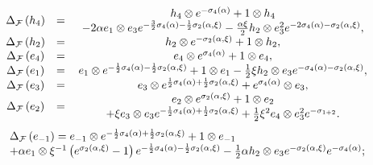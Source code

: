\documentclass[a4paper,12pt,showkeys]{article}
\begin{document}
\begin{eqnarray*}
\begin{array}{ccc}
\Delta _{{\cal F}}\left( h_{4}\right)  & = &
\begin{array}{c}
h_{4}\otimes e^{-{\bf  \sigma }_{4} (\alpha) }+1\otimes h_{4}
\\
- 2 \alpha   e_1 \otimes  e_3 e^{-\frac{3}{2}{\bf  \sigma }_{4}
(\alpha) -\frac{1}{2}{\bf %
 \sigma }_{2} (\alpha, \xi ) }-\frac{\alpha \xi }{2} h_2 \otimes  e_3 ^{2}e^{-2{\bf %
 \sigma }_{4} (\alpha) -{\bf  \sigma }_{2} (\alpha, \xi ) },%
\end{array}
\\
\Delta _{{\cal F}}\left(  h_2 \right)  & = &  h_2 \otimes e^{-{\bf %
 \sigma }_{2} (\alpha, \xi ) }+1\otimes  h_2 ,
 \\
\Delta _{{\cal F}}\left(  e_4 \right)  & = &  e_4 \otimes e^{{\bf
 \sigma }_{4} (\alpha) }+1\otimes  e_4 ,
 \\
\Delta _{{\cal F}}\left(   e_1 \right)
& = &   e_1 \otimes e^{-\frac{1}{2}%
{\bf  \sigma }_{4} (\alpha) -\frac{1}{2}{\bf  \sigma }_{2}
(\alpha, \xi ) }+1\otimes
  e_1 - \frac{1}{2} \xi
 h_2 \otimes  e_3 e^{-{\bf  \sigma }_{4}
  (\alpha) -{\bf  \sigma }_{2} (\alpha, \xi ) },
 \\
\Delta _{{\cal F}}\left(  e_3 \right)
  & = &  e_3 \otimes e^{\frac{1}{2}{\bf %
 \sigma }_{4} (\alpha)
  +\frac{1}{2}{\bf  \sigma }_{2} (\alpha, \xi ) } +
 e^{{\bf \sigma }%
_{4}(\alpha)}\otimes  e_3 ,
\\
\Delta _{{\cal F}}\left(   e_2\right)  & = &
\begin{array}{c}
  e_2\otimes e^{{  \sigma }_{2} (\alpha, \xi ) }+1\otimes   e_2
  \\
+ \xi  e_3 \otimes  e_3 e^{-\frac{1}{2}
{  \sigma }_{4} (\alpha) +\frac{1}{2}{\bf %
 \sigma }_{2} (\alpha, \xi ) }
 + \frac{1}{2}\xi ^{2} e_4 \otimes  e_3 ^{2}e^{-{\bf \sigma }%
_{1+2}}.%
\end{array}%
\end{array}
\label{cop-pos}
\end{eqnarray*}%
\[
\begin{array}{l}
\Delta _{{\sf {\cal F}}}\left(   e_{-1} \right) =  e_{-1} \otimes e^{-\frac{1}{2}%
{\bf  \sigma }_{4} (\alpha) +\frac{1}{2}{\bf  \sigma }_{2}
(\alpha, \xi ) }+1\otimes   e_{-1}
\\
+ \alpha   e_1 \otimes \xi ^{-1}\left( e^{{\bf  \sigma }_{2}
 (\alpha, \xi ) }-1\right) e^{-%
\frac{1}{2}{\bf  \sigma }_{4} (\alpha) -\frac{1}{2}{\bf  \sigma
}_{2} (\alpha, \xi ) } - \frac{1}{2}\alpha
 h_2 \otimes  e_3 e^{-{\bf  \sigma }_{2}
 (\alpha, \xi ) }e^{-{\bf  \sigma }_{4} (\alpha) };%
\end{array}%
\]%
\end{document}
